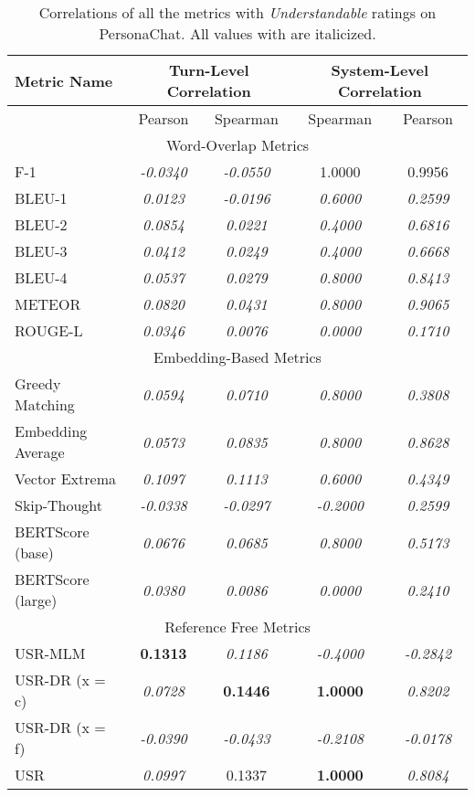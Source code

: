 \documentclass[11pt,a4paper]{article}
\begin{document}
\begin{table*}
    \centering
    \renewcommand*{\arraystretch}{1.2}
    \begin{tabular}{|l|c|c|c|c|}
    \hline
        \textbf{Metric Name} & \multicolumn{2}{|c|}{\textbf{Turn-Level Correlation}} & \multicolumn{2}{|c|}{\textbf{System-Level Correlation}}  \\ \hline
         & Pearson & Spearman & Spearman & Pearson \\ \hline
         \multicolumn{5}{|c|}{Word-Overlap Metrics} \\ \hline
F-1 & \textit{-0.0340} & \textit{-0.0550} & 1.0000 & 0.9956 \\
BLEU-1 & \textit{0.0123} & \textit{-0.0196} & \textit{0.6000} & \textit{0.2599} \\
BLEU-2 & \textit{0.0854} & \textit{0.0221} & \textit{0.4000} & \textit{0.6816} \\
BLEU-3 & \textit{0.0412} & \textit{0.0249} & \textit{0.4000} & \textit{0.6668} \\
BLEU-4 & \textit{0.0537} & \textit{0.0279} & \textit{0.8000} & \textit{0.8413} \\
METEOR & \textit{0.0820} & \textit{0.0431} & \textit{0.8000} & \textit{0.9065} \\
ROUGE-L & \textit{0.0346} & \textit{0.0076} & \textit{0.0000} & \textit{0.1710} \\\hline 
 \multicolumn{5}{|c|}{Embedding-Based Metrics} \\ \hline
Greedy Matching & \textit{0.0594} & \textit{0.0710} & \textit{0.8000} & \textit{0.3808} \\
Embedding Average & \textit{0.0573} & \textit{0.0835} & \textit{0.8000} & \textit{0.8628} \\
Vector Extrema & \textit{0.1097} & \textit{0.1113} & \textit{0.6000} & \textit{0.4349} \\
Skip-Thought & \textit{-0.0338} & \textit{-0.0297} & \textit{-0.2000} & \textit{0.2599} \\
BERTScore (base) & \textit{0.0676} & \textit{0.0685} & \textit{0.8000} & \textit{0.5173} \\
BERTScore (large) & \textit{0.0380} & \textit{0.0086} & \textit{0.0000} & \textit{0.2410} \\\hline 
 \multicolumn{5}{|c|}{Reference Free Metrics} \\ \hline
USR-MLM & \textbf{0.1313} & \textit{0.1186} & \textit{-0.4000} & \textit{-0.2842} \\
USR-DR (x = c) & \textit{0.0728} & \textbf{0.1446} & \textbf{1.0000} & \textit{0.8202} \\
USR-DR (x = f) & \textit{-0.0390} & \textit{-0.0433} & \textit{-0.2108} & \textit{-0.0178} \\
USR & \textit{0.0997} & 0.1337 & \textbf{1.0000} & \textit{0.8084} \\\hline
    \end{tabular}
    \caption{Correlations of all the metrics with \textit{Understandable} ratings on PersonaChat. All values with  are italicized.}
    
\end{table*}
\end{document}
